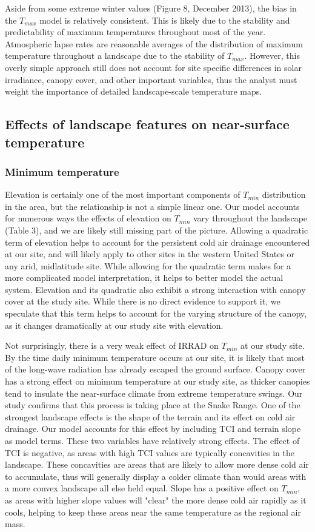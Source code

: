 \documentclass{ametsoc}
\begin{document}
Aside from some extreme winter values (Figure 8, December 2013), the bias in the
$T_{max}$ model is relatively consistent. This is likely due to the stability
and predictability of maximum temperatures throughout most of the year.
Atmospheric lapse rates are reasonable averages of the distribution of maximum
temperature throughout a landscape due to the stability of $T_{max}$. However,
this overly simple approach still does not account for site specific differences
in solar irradiance, canopy cover, and other important variables, thus the
analyst must weight the importance of detailed landscape-scale temperature maps.


\subsection{Effects of landscape features on near-surface temperature}
\subsubsection{Minimum temperature}
Elevation is certainly one of the most important components of $T_{min}$
distribution in the area, but the relationship is not a simple linear one. Our
model accounts for numerous ways the effects of elevation on $T_{min}$ vary
throughout the landscape (Table 3), and we are likely still missing part of the
picture. Allowing a quadratic term of elevation helps to account for the
persistent cold air drainage encountered at our site, and will likely apply to
other sites in the western United States or any arid, midlatitude site. While
allowing for the quadratic term makes for a more complicated model
interpretation, it helps to better model the actual system. Elevation and its
quadratic also exhibit a strong interaction with canopy cover at the study site.
While there is no direct evidence to support it, we speculate that this term
helps to account for the varying structure of the canopy, as it changes
dramatically at our study site with elevation.

Not surprisingly, there is a very weak effect of IRRAD on $T_{min}$ at our study
site. By the time daily minimum temperature occurs at our site, it is likely
that most of the long-wave radiation has already escaped the ground surface.
Canopy cover has a strong effect on minimum temperature at our study site, as
thicker canopies tend to insulate the near-surface climate from extreme
temperature swings. Our study confirms that this process is taking place at the
Snake Range. One of the strongest landscape effects is the shape of the terrain
and its effect on cold air drainage. Our model accounts for this effect by
including TCI and terrain slope as model terms. These two variables have
relatively strong effects. The effect of TCI is negative, as areas with high TCI
values are typically concavities in the landscape. These concavities are areas
that are likely to allow more dense cold air to accumulate, thus will generally
display a colder climate than would areas with a more convex landscape all else
held equal. Slope has a positive effect on $T_{min}$, as areas with higher slope
values will "clear" the more dense cold air rapidly as it cools, helping to keep
these areas near the same temperature as the regional air mass.
\end{document}
